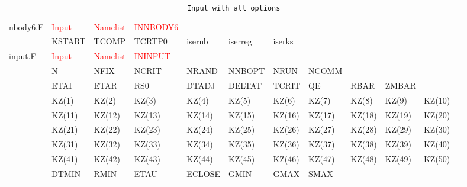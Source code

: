 {\tt\scriptsize
\begin{longtable}{|p{0.6in}|*{10}{l}|} 
\caption{\texttt{Input with all options}}
\label{table:allinput}\\
\hline
nbody6.F & \textcolor{red}{Input}& \textcolor{red}{Namelist}&  \textcolor{red}{INNBODY6} &&&&&&&\\
         & KSTART   & TCOMP    & TCRTP0   & isernb   & iserreg  
         & iserks   &          &          &          &          \\\hline
input.F &  \textcolor{red}{Input}& \textcolor{red}{Namelist}&  \textcolor{red}{ININPUT} &&&&&&&\\
        & N        & NFIX     &  NCRIT   & NRAND    & NNBOPT   &
           NRUN    & NCOMM    &          &          &          \\

        & ETAI     & ETAR     & RS0      & DTADJ    & DELTAT   &
           TCRIT    & QE       & RBAR     & ZMBAR    &          \\

        & KZ(1)    & KZ(2)    & KZ(3)    & KZ(4)    & KZ(5)    &
           KZ(6)    & KZ(7)    & KZ(8)    & KZ(9)~~~~KZ(10)&   \\
         
        & KZ(11)   & KZ(12)   & KZ(13)   & KZ(14)   & KZ(15)   &
           KZ(16)   & KZ(17)   & KZ(18)   & KZ(19)~~~KZ(20)&   \\
         
        & KZ(21)   & KZ(22)   & KZ(23)   & KZ(24)   & KZ(25)   &
           KZ(26)   & KZ(27)   & KZ(28)   & KZ(29)~~~KZ(30)&   \\
         
        & KZ(31)   & KZ(32)   & KZ(33)   & KZ(34)   & KZ(35)   &
           KZ(36)   & KZ(37)   & KZ(38)   & KZ(39)~~~KZ(40)&   \\
         
        & KZ(41)   & KZ(42)    & KZ(43)    & KZ(44)    & KZ(45)    &
          KZ(46)    & KZ(47)    & KZ(48)    & KZ(49)~~~KZ(50)&   \\
         
        & DTMIN    & RMIN     & ETAU     & ECLOSE   & GMIN     &
           GMAX     & SMAX     &          &          &          \\\hline


\end{longtable}}
